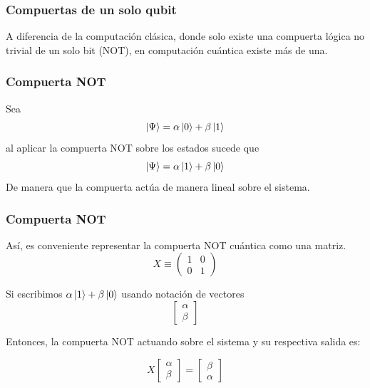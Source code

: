 \documentclass{beamer}
\begin{document}
\begin{frame}
  \frametitle{Compuertas de un solo qubit}
  A diferencia de la computación clásica, donde solo existe una compuerta lógica no trivial de un solo bit (NOT),
  en computación cuántica existe más de una.
\end{frame}

\begin{frame}
  \frametitle{Compuerta NOT}
  Sea 
  $$\ket{\Psi} = \alpha\ket{0} + \beta\ket{1}$$
  al aplicar la compuerta NOT sobre los estados sucede que
  $$\ket{\Psi} = \alpha\ket{1} + \beta\ket{0}$$
  De manera que la compuerta actúa de manera lineal sobre el sistema.
\end{frame}

\begin{frame}
  \frametitle{Compuerta NOT}
  Así, es conveniente representar la compuerta NOT cuántica como una matriz.
  $$X \equiv
  \begin{pmatrix}
    1 & 0 \\
    0 & 1
  \end{pmatrix}$$
  
  
\end{frame}

\begin{frame}
  Si escribimos $\alpha\ket{1} + \beta\ket{0}$ usando notación de vectores
  $$
  \begin{bmatrix}
    \alpha \\
    \beta
  \end{bmatrix}
  $$

  Entonces, la compuerta NOT actuando sobre el sistema y su respectiva salida es:

  $$
  X\begin{bmatrix}
    \alpha \\
    \beta
  \end{bmatrix} =
  \begin{bmatrix}
    \beta \\
    \alpha
  \end{bmatrix}
  $$
\end{frame}
\end{document}
